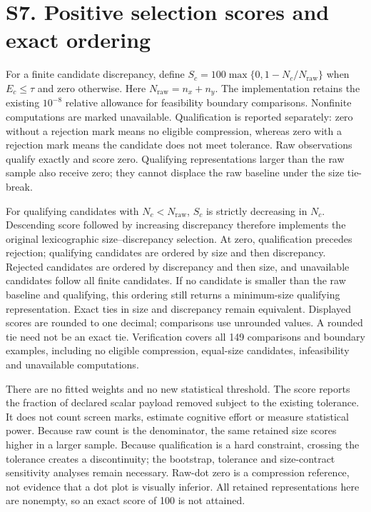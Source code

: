 \documentclass[10pt]{article}
\begin{document}
\section*{S7. Positive selection scores and exact ordering}
For a finite candidate discrepancy, define $S_c=100\max\{0,1-N_c/N_{\mathrm{raw}}\}$ when $E_c\leq\tau$ and zero otherwise. Here $N_{\mathrm{raw}}=n_x+n_y$. The implementation retains the existing $10^{-8}$ relative allowance for feasibility boundary comparisons. Nonfinite computations are marked unavailable. Qualification is reported separately: zero without a rejection mark means no eligible compression, whereas zero with a rejection mark means the candidate does not meet tolerance. Raw observations qualify exactly and score zero. Qualifying representations larger than the raw sample also receive zero; they cannot displace the raw baseline under the size tie-break.

For qualifying candidates with $N_c<N_{\mathrm{raw}}$, $S_c$ is strictly decreasing in $N_c$. Descending score followed by increasing discrepancy therefore implements the original lexicographic size--discrepancy selection. At zero, qualification precedes rejection; qualifying candidates are ordered by size and then discrepancy. Rejected candidates are ordered by discrepancy and then size, and unavailable candidates follow all finite candidates. If no candidate is smaller than the raw baseline and qualifying, this ordering still returns a minimum-size qualifying representation. Exact ties in size and discrepancy remain equivalent. Displayed scores are rounded to one decimal; comparisons use unrounded values. A rounded tie need not be an exact tie. Verification covers all 149 comparisons and boundary examples, including no eligible compression, equal-size candidates, infeasibility and unavailable computations.

There are no fitted weights and no new statistical threshold. The score reports the fraction of declared scalar payload removed subject to the existing tolerance. It does not count screen marks, estimate cognitive effort or measure statistical power. Because raw count is the denominator, the same retained size scores higher in a larger sample. Because qualification is a hard constraint, crossing the tolerance creates a discontinuity; the bootstrap, tolerance and size-contract sensitivity analyses remain necessary. Raw-dot zero is a compression reference, not evidence that a dot plot is visually inferior. All retained representations here are nonempty, so an exact score of 100 is not attained.
\end{document}
